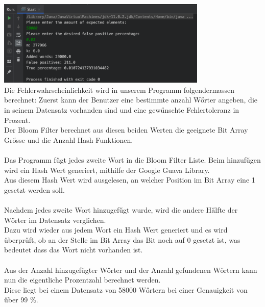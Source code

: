 \documentclass[11pt, a4paper]{article}
\begin{document}
\includegraphics[width=10cm]{image/Result.png}\\
Die Fehlerwahrscheinlichkeit wird in unserem Programm folgendermassen berechnet:
Zuerst kann der Benutzer eine bestimmte anzahl W{\H o}rter angeben, die in seinem Datensatz vorhanden sind und eine gew{\H u}nschte Fehlertoleranz in Prozent.\\
Der Bloom Filter berechnet aus diesen beiden Werten die geeignete Bit Array Gr{\H o}sse und die Anzahl Hash Funktionen.\\
\\
Das Programm f{\H u}gt jedes zweite Wort in die Bloom Filter Liste. Beim hinzuf{\H u}gen wird ein Hash Wert generiert, mithilfe der Google Guava Library.\\
Aus diesem Hash Wert wird ausgelesen, an welcher Position im Bit Array eine 1 gesetzt werden soll.\\
\\
Nachdem jedes zweite Wort hinzugef{\H u}gt wurde, wird die andere H{\H a}lfte der W{\H o}rter im Datensatz verglichen.\\
Dazu wird wieder aus jedem Wort ein Hash Wert generiert und es wird {\H u}berpr{\H u}ft, ob an der Stelle im Bit Array das Bit noch auf 0 gesetzt ist, was bedeutet dass das Wort nicht vorhanden ist.\\
\\
Aus der Anzahl hinzugef{\H u}gter W{\H o}rter und der Anzahl gefundenen W{\H o}rtern kann nun die eigentliche Prozentzahl berechnet werden.\\
Diese liegt bei einem Datensatz von 58000 W{\H o}rtern bei einer Genauigkeit von {\H u}ber 99 \%.
\\
\end{document}
